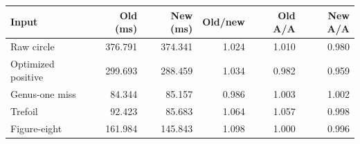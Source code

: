 \begin{tabular}{lrrrrr}
\toprule
Input & Old (ms) & New (ms) & Old/new & Old A/A & New A/A \\
\midrule
Raw circle & 376.791 & 374.341 & 1.024 & 1.010 & 0.980 \\
Optimized positive & 299.693 & 288.459 & 1.034 & 0.982 & 0.959 \\
Genus-one miss & 84.344 & 85.157 & 0.986 & 1.003 & 1.002 \\
Trefoil & 92.423 & 85.683 & 1.064 & 1.057 & 0.998 \\
Figure-eight & 161.984 & 145.843 & 1.098 & 1.000 & 0.996 \\
\bottomrule
\end{tabular}
